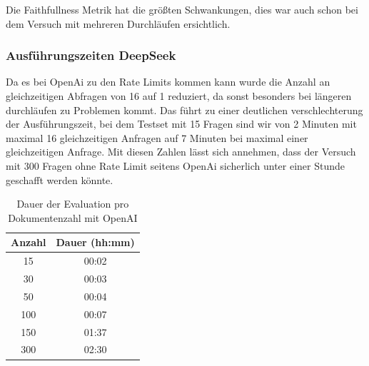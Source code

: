Die Faithfullness Metrik hat die größten Schwankungen, dies war auch schon bei dem Versuch mit mehreren Durchläufen ersichtlich.



\subsubsection{Ausführungszeiten DeepSeek}
Da es bei OpenAi zu den Rate Limits kommen kann wurde die Anzahl an gleichzeitigen Abfragen von 16 auf 1 reduziert, da sonst besonders bei längeren durchläufen zu Problemen kommt.
Das führt zu einer deutlichen verschlechterung der Ausführungszeit, bei dem Testset mit 15 Fragen sind wir von 2 Minuten mit maximal 16 gleichzeitigen Anfragen auf 7 Minuten bei maximal einer gleichzeitigen Anfrage.
Mit diesen Zahlen lässt sich annehmen, dass der Versuch mit 300 Fragen ohne Rate Limit seitens OpenAi sicherlich unter einer Stunde geschafft werden könnte.

\begin{table}[h!]
    \centering
    \begin{tabular}{|c|c|}
    \hline
    \textbf{Anzahl} & \textbf{Dauer (hh:mm)} \\
    \hline
    15   & 00:02 \\
    30   & 00:03 \\
    50   & 00:04 \\
    100  & 00:07 \\
    150  & 01:37 \\
    300  & 02:30 \\
    \hline
    \end{tabular}
    \caption{Dauer der Evaluation pro Dokumentenzahl mit OpenAI}
\end{table}

